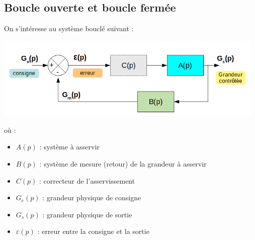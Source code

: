 \enteteThematiqueObligatoire{}



\subsection*{Boucle ouverte et boucle fermée}

On s'intéresse au système bouclé suivant :

\begin{center}
	\includegraphics[width=13cm]{images/syst_asservi.png}
\end{center}

où :

\begin{itemize}
	\item $A(p)$ : système à asservir
	\item $B(p)$ : système de mesure (retour) de la grandeur à asservir
	\item $C(p)$ : correcteur de l'asservissement
	\item $G_e(p)$ : grandeur physique de consigne
	\item $G_s(p)$ : grandeur physique de sortie
	\item $\varepsilon(p)$ : erreur entre la consigne et la sortie
\end{itemize}

